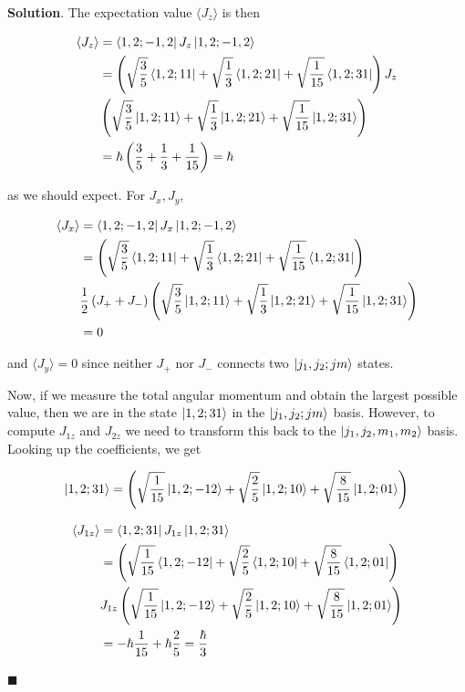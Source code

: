 \documentclass[12pt]{article}
\theoremstyle{definition}
\newenvironment{s}{%
        \begin{trivlist} \item \textbf{Solution}. }{%
            \hspace*{\fill} $\blacksquare$\end{trivlist}}%
\begin{document}
{\begin{s}
The expectation value $\langle J_z \rangle$ is then

\begin{align*}
\langle J_z \rangle &= \bra{1,2;-1,2} J_z \ket{1,2;-1,2} \\
&= \left(\sqrt{\frac{3}{5}}\bra{1,2;1 1} + \sqrt{\frac{1}{3}}\bra{1,2;2 1} + \sqrt{\frac{1}{15}}\bra{1,2;3 1}\right)J_{z}\\
&\left(\sqrt{\frac{3}{5}}\ket{1,2;1 1} + \sqrt{\frac{1}{3}}\ket{1,2;2 1} + \sqrt{\frac{1}{15}}\ket{1,2;3 1}\right)\\
&= \hbar\left(\frac{3}{5}+\frac{1}{3}+\frac{1}{15}\right) = \hbar
\end{align*}

as we should expect. For $J_x, J_y$, 

\begin{align*}
\langle J_x \rangle &= \bra{1,2;-1,2} J_x \ket{1,2;-1,2} \\
&= \left(\sqrt{\frac{3}{5}}\bra{1,2;1 1} + \sqrt{\frac{1}{3}}\bra{1,2;2 1} + \sqrt{\frac{1}{15}}\bra{1,2;3 1}\right)\\
&\frac{1}{2}\left(J_+ + J_-\right)\left(\sqrt{\frac{3}{5}}\ket{1,2;1 1} + \sqrt{\frac{1}{3}}\ket{1,2;2 1} + \sqrt{\frac{1}{15}}\ket{1,2;3 1}\right)\\
&= 0
\end{align*}

and $\langle J_{y} \rangle = 0$ since neither $J_+$ nor $J_-$ connects two $\ket{j_1,j_2;jm}$ states.

Now, if we measure the total angular momentum and obtain the largest possible value, then we are in the state $\ket{1,2;31}$ in the $\ket{j_1,j_2;jm}$ basis. However, to compute $J_{1z}$ and $J_{2z}$ we need to transform this back to the $\ket{j_1, j_2, m_1, m_2}$ basis. Looking up the coefficients, we get

\begin{align*}
\ket{1,2;31} = \left(\sqrt{\frac{1}{15}}\ket{1,2;-12} + \sqrt{\frac{2}{5}}\ket{1,2;10} + \sqrt{\frac{8}{15}}\ket{1,2;01}\right)
\end{align*}

\begin{align*}
\langle J_{1z} \rangle &= \bra{1,2;31} J_{1z}  \ket{1,2;31} \\
&= \left(\sqrt{\frac{1}{15}}\bra{1,2;-12} + \sqrt{\frac{2}{5}}\bra{1,2;10} + \sqrt{\frac{8}{15}}\bra{1,2;01}\right)\\
&J_{1z}\left(\sqrt{\frac{1}{15}}\ket{1,2;-12} + \sqrt{\frac{2}{5}}\ket{1,2;10} + \sqrt{\frac{8}{15}}\ket{1,2;01}\right)\\
&= -\hbar\frac{1}{15} + \hbar\frac{2}{5} =  \frac{\hbar}{3}
\end{align*}


\end{s}}
\end{document}
